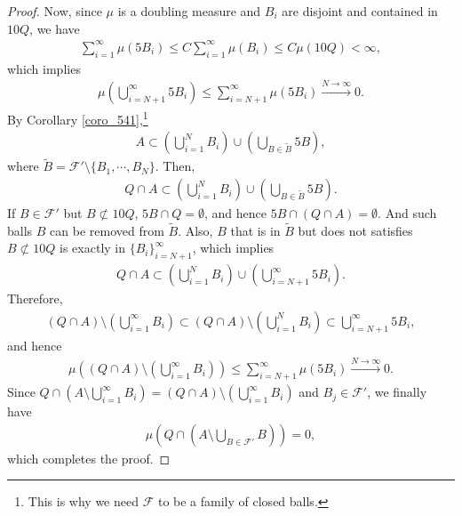 \documentclass[11pt]{book}
\theoremstyle{definition}
\numberwithin{equation}{chapter}
\begin{document}
\begin{proof}
Now, since $\mu$ is a doubling measure and $B_i$ are disjoint and contained in $10Q$, we have
\begin{align*}
    \sum^\infty_{i=1} \mu(5B_i) \leq C \sum^\infty_{i=1} \mu(B_i) \leq C \mu(10Q) < \infty,
\end{align*}
which implies
\begin{align*}
    \mu\left(\bigcup^\infty_{i=N+1} 5B_i\right) \leq \sum^\infty_{i=N+1} \mu(5B_i) \xrightarrow[]{N\to\infty} 0.
\end{align*}
By Corollary \ref{coro_541},\footnote{This is why we need $\mathcal{F}$ to be a family of closed balls.}
\begin{align*}
    A \subset \left(\bigcup^N_{i=1} B_i \right) \cup \left(\bigcup_{B \in \widetilde{B}} 5B\right),
\end{align*}
where $\widetilde{B} = \mathcal{F}' \setminus \{B_1,\cdots,B_N\}$. Then,
\begin{align*}
    Q \cap A \subset \left(\bigcup^N_{i=1} B_i \right) \cup \left(\bigcup_{B \in \widetilde{B}} 5B\right).
\end{align*}
If $B \in \mathcal{F}'$ but $B \not\subset 10Q$, $5B \cap Q = \emptyset$, and hence $5B \cap (Q \cap A) = \emptyset$. And such balls $B$ can be removed from $\widetilde{B}$. Also, $B$ that is in $\widetilde{B}$ but does not satisfies $B \not\subset 10Q$ is exactly in $\{B_i\}^\infty_{i=N+1}$, which implies
\begin{align*}
    Q \cap A \subset \left(\bigcup^N_{i=1} B_i \right) \cup \left(\bigcup^\infty_{i=N+1} 5 B_i\right).
\end{align*}
Therefore,
\begin{align*}
    (Q \cap A) \setminus \left(\bigcup^\infty_{i=1} B_i \right) \subset (Q \cap A) \setminus \left(\bigcup^N_{i=1} B_i \right) \subset \bigcup^\infty_{i=N+1} 5 B_i,
\end{align*}
and hence
\begin{align*}
    \mu \left((Q \cap A) \setminus \left(\bigcup^\infty_{i=1} B_i \right) \right) \leq \sum^\infty_{i=N+1} \mu(5B_i) \xrightarrow[]{N\to\infty} 0.
\end{align*}
Since $Q \cap \left(A \setminus \bigcup^\infty_{i=1} B_i\right) = (Q \cap A) \setminus \left(\bigcup^\infty_{i=1} B_i \right)$ and $B_j \in \mathcal{F}'$, we finally have
\begin{align*}
    \mu \left(Q \cap \left(A \setminus \bigcup_{B \in \mathcal{F}'} B\right)\right) = 0,
\end{align*}
which completes the proof.
\end{proof}
\end{document}
